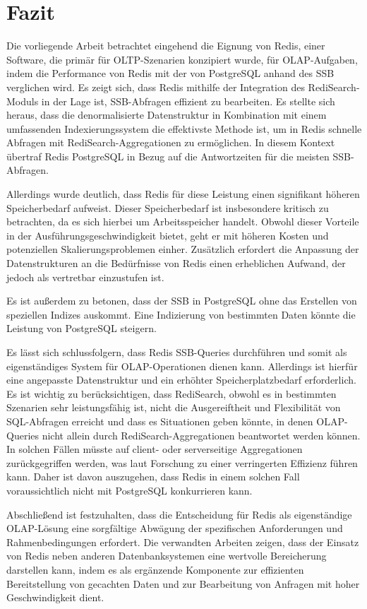 \chapter{Fazit}
Die vorliegende Arbeit betrachtet eingehend die Eignung von Redis, einer Software, die primär für OLTP-Szenarien konzipiert wurde, für OLAP-Aufgaben, indem die Performance von Redis mit der von PostgreSQL anhand des \acf{SSB} verglichen wird. Es zeigt sich, dass Redis mithilfe der Integration des RediSearch-Moduls in der Lage ist, SSB-Abfragen effizient zu bearbeiten. Es stellte sich heraus, dass die denormalisierte Datenstruktur in Kombination mit einem umfassenden Indexierungssystem die effektivste Methode ist, um in Redis schnelle Abfragen mit RediSearch-Aggregationen zu ermöglichen. In diesem Kontext übertraf Redis PostgreSQL in Bezug auf die Antwortzeiten für die meisten SSB-Abfragen.

Allerdings wurde deutlich, dass Redis für diese Leistung einen signifikant höheren Speicherbedarf aufweist. Dieser Speicherbedarf ist insbesondere kritisch zu betrachten, da es sich hierbei um Arbeitsspeicher handelt. Obwohl dieser Vorteile in der Ausführungsgeschwindigkeit bietet, geht er mit höheren Kosten und potenziellen Skalierungsproblemen einher. Zusätzlich erfordert die Anpassung der Datenstrukturen an die Bedürfnisse von Redis einen erheblichen Aufwand, der jedoch als vertretbar einzustufen ist.

Es ist außerdem zu betonen, dass der \acf{SSB} in PostgreSQL ohne das Erstellen von speziellen Indizes auskommt. Eine Indizierung von bestimmten Daten könnte die Leistung von PostgreSQL steigern.

Es lässt sich schlussfolgern, dass Redis SSB-Queries durchführen und somit als eigenständiges System für OLAP-Operationen dienen kann. Allerdings ist hierfür eine angepasste Datenstruktur und ein erhöhter Speicherplatzbedarf erforderlich. Es ist wichtig zu berücksichtigen, dass RediSearch, obwohl es in bestimmten Szenarien sehr leistungsfähig ist, nicht die Ausgereiftheit und Flexibilität von SQL-Abfragen erreicht und dass es Situationen geben könnte, in denen OLAP-Queries nicht allein durch RediSearch-Aggregationen beantwortet werden können. In solchen Fällen müsste auf client- oder serverseitige Aggregationen zurückgegriffen werden, was laut Forschung zu einer verringerten Effizienz führen kann. Daher ist davon auszugehen, dass Redis in einem solchen Fall voraussichtlich nicht mit PostgreSQL konkurrieren kann.

Abschließend ist festzuhalten, dass die Entscheidung für Redis als eigenständige OLAP-Lösung eine sorgfältige Abwägung der spezifischen Anforderungen und Rahmenbedingungen erfordert. Die verwandten Arbeiten zeigen, dass der Einsatz von Redis neben anderen Datenbanksystemen eine wertvolle Bereicherung darstellen kann, indem es als ergänzende Komponente zur effizienten Bereitstellung von gecachten Daten und zur Bearbeitung von Anfragen mit hoher Geschwindigkeit dient. 


